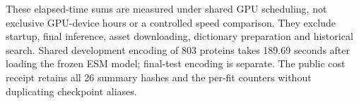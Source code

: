 These elapsed-time sums are measured under shared GPU scheduling, not exclusive GPU-device hours or a controlled speed comparison. They exclude startup, final inference, asset downloading, dictionary preparation and historical search. Shared development encoding of 803 proteins takes 189.69 seconds after loading the frozen ESM model; final-test encoding is separate. The public cost receipt retains all 26 summary hashes and the per-fit counters without duplicating checkpoint aliases.
